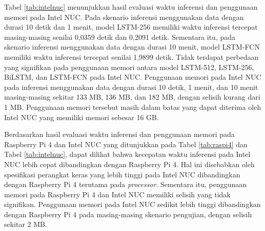 Tabel \ref{tab:intelnuc} menunjukkan hasil evaluasi waktu inferensi dan penggunaan memori pada Intel NUC.
Pada skenario inferensi menggunakan data dengan durasi 10 detik dan 1 menit, model LSTM-256 memiliki waktu inferensi tercepat masing-masing senilai 0,0359 detik dan 0,2091 detik.
Sementara itu, pada skenario inferensi menggunakan data dengan durasi 10 menit, model LSTM-FCN memiliki waktu inferensi tercepat senilai 1,9899 detik.
Tidak terdapat perbedaan yang signifikan pada penggunaan memori antara model LSTM-512, LSTM-256, BiLSTM, dan LSTM-FCN pada Intel NUC.
Penggunaan memori pada Intel NUC pada inferensi menggunakan data dengan durasi 10 detik, 1 menit, dan 10 menit masing-masing sekitar 133 MB, 136 MB, dan 182 MB, dengan selisih kurang dari 1 MB.
Penggunaan memori tersebut masih dalam batas yang dapat diterima oleh Intel NUC yang memiliki memori sebesar 16 GB.

Berdasarkan hasil evaluasi waktu inferensi dan penggunaan memori pada Raspberry Pi 4 dan Intel NUC yang ditunjukkan pada Tabel \ref{tab:raspi4} dan Tabel \ref{tab:intelnuc}, dapat dilihat bahwa kecepatan waktu inferensi pada Intel NUC lebih cepat dibandingkan dengan Raspberry Pi 4.
Hal ini disebabkan oleh spesifikasi perangkat keras yang lebih tinggi pada Intel NUC dibandingkan dengan Raspberry Pi 4 terutama pada \textit{processor}.
Sementara itu, penggunaan memori pada Raspberry Pi 4 dan Intel NUC memiliki selisih yang tidak signifikan.
Penggunaan memori pada Intel NUC sedikit lebih tinggi dibandingkan dengan Raspberry Pi 4 pada masing-masing skenario pengujian, dengan selisih sekitar 2 MB.




